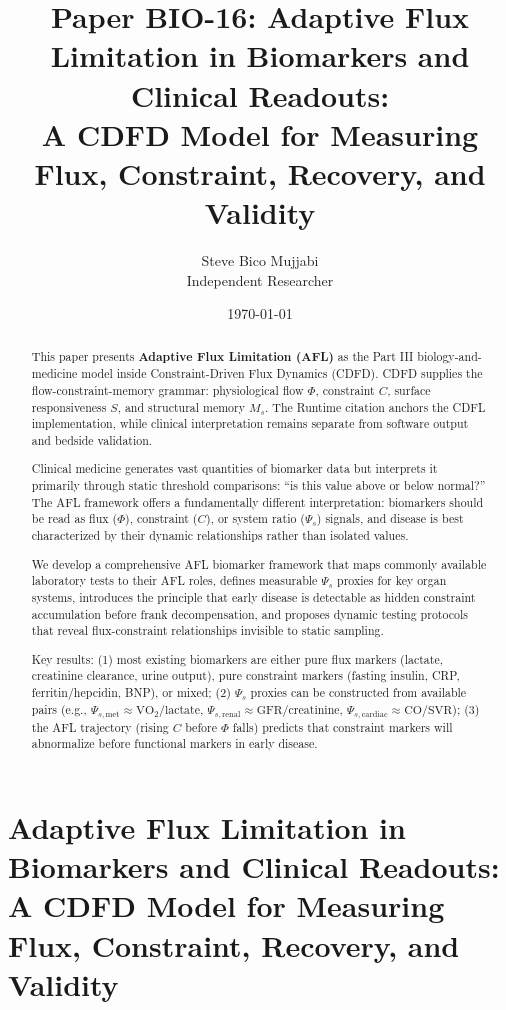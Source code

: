 \documentclass[12pt,a4paper]{article}
\title{\textbf{Paper BIO-16: Adaptive Flux Limitation in Biomarkers and Clinical Readouts:\\ A CDFD Model for Measuring Flux, Constraint, Recovery, and Validity}}
\author{Steve Bico Mujjabi\\ \small Independent Researcher}
\date{\today}
\begin{document}
\maketitle

\clearpage
\section*{Adaptive Flux Limitation in Biomarkers and Clinical Readouts: A CDFD Model for Measuring Flux, Constraint, Recovery, and Validity}

\begin{abstract}

This paper presents \textbf{Adaptive Flux Limitation (AFL)} as the Part III biology-and-medicine model inside Constraint-Driven Flux Dynamics (CDFD). CDFD supplies the flow-constraint-memory grammar: physiological flow $\Phi$, constraint $C$, surface responsiveness $S$, and structural memory $M_s$. The Runtime citation anchors the CDFL implementation, while clinical interpretation remains separate from software output and bedside validation.

Clinical medicine generates vast quantities of biomarker data but interprets it primarily through static threshold comparisons: ``is this value above or below normal?'' The AFL framework offers a fundamentally different interpretation: biomarkers should be read as flux ($\Phi$), constraint ($C$), or system ratio ($\Psi_s$) signals, and disease is best characterized by their dynamic relationships rather than isolated values.

We develop a comprehensive AFL biomarker framework that maps commonly available laboratory tests to their AFL roles, defines measurable $\Psi_s$ proxies for key organ systems, introduces the principle that early disease is detectable as hidden constraint accumulation before frank decompensation, and proposes dynamic testing protocols that reveal flux-constraint relationships invisible to static sampling.

Key results: (1) most existing biomarkers are either pure flux markers (lactate, creatinine clearance, urine output), pure constraint markers (fasting insulin, CRP, ferritin/hepcidin, BNP), or mixed; (2) $\Psi_s$ proxies can be constructed from available pairs (e.g., $\Psi_{s,\mathrm{met}} \approx \mathrm{VO}_2/\mathrm{lactate}$, $\Psi_{s,\mathrm{renal}} \approx \mathrm{GFR}/\mathrm{creatinine}$, $\Psi_{s,\mathrm{cardiac}} \approx \mathrm{CO}/\mathrm{SVR}$); (3) the AFL trajectory (rising $C$ before $\Phi$ falls) predicts that constraint markers will abnormalize before functional markers in early disease.


\end{abstract}
\end{document}
